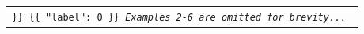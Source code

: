 \begin{table}[!th]
\begin{tabular}{>{\raggedright\arraybackslash\tt}p{}<{}}
\}\}\newline%
\newline%
\{\{\newline%
    "label": 0\newline%
\}\}\newline%
\newline%
\textit{Examples 2-6 are omitted for brevity...}\newline%
\newline%

\end{tabular}
\end{table}
